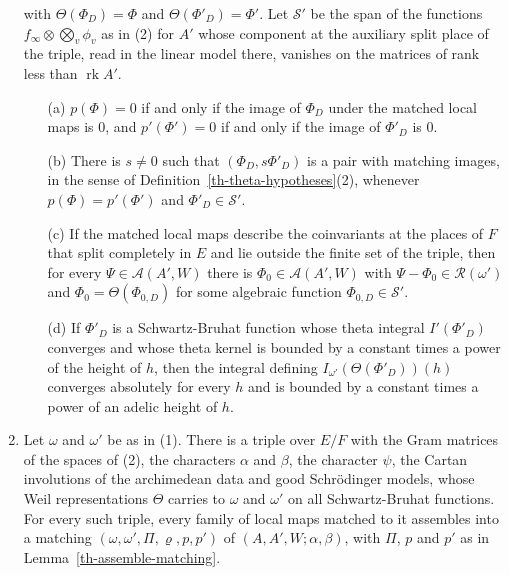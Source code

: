 \begin{lemma}
\begin{enumerate}
  with $\Theta(\Phi_D)=\Phi$ and $\Theta(\Phi'_D)=\Phi'$. Let $\mathcal S'$ be
  the span of the functions $f_\infty\otimes\bigotimes_v\phi_v$ as in (2) for
  $A'$ whose component at the auxiliary split place of the triple, read in the
  linear model there, vanishes on the matrices of rank less than
  $\operatorname{rk}A'$.
  \begin{enumerate}
  \item[(a)] $p(\Phi)=0$ if and only if the image of $\Phi_D$ under the
    matched local maps is $0$, and $p'(\Phi')=0$ if and only if the image of
    $\Phi'_D$ is $0$.
  \item[(b)] There is $s\neq0$ such that $(\Phi_D,s\Phi'_D)$ is a pair with
    matching images, in the sense of Definition~\ref{th-theta-hypotheses}(2),
    whenever $p(\Phi)=p'(\Phi')$ and $\Phi'_D\in\mathcal S'$.
  \item[(c)] If the matched local maps describe the coinvariants at the places
    of $F$ that split completely in $E$ and lie outside the finite set of the
    triple, then for every $\Psi\in\mathcal A(A',W)$ there is
    $\Phi_0\in\mathcal A(A',W)$ with $\Psi-\Phi_0\in\mathcal R(\omega')$ and
    $\Phi_0=\Theta(\Phi_{0,D})$ for some algebraic function
    $\Phi_{0,D}\in\mathcal S'$.
  \item[(d)] If $\Phi'_D$ is a Schwartz-Bruhat function whose theta integral
    $I'(\Phi'_D)$ converges and whose theta kernel is bounded by a constant
    times a power of the height of $h$, then the integral defining
    $I_{\omega'}(\Theta(\Phi'_D))(h)$ converges absolutely for every $h$ and
    is bounded by a constant times a power of an adelic height of $h$.
  \end{enumerate}
\item Let $\omega$ and $\omega'$ be as in (1). There is a triple over $E/F$
  with the Gram matrices of the spaces of (2), the characters $\alpha$ and
  $\beta$, the character $\psi$, the Cartan involutions of the archimedean
  data and good Schrödinger models, whose Weil representations $\Theta$
  carries to $\omega$ and $\omega'$ on all Schwartz-Bruhat functions. For every
  such triple, every family of local maps matched to it assembles into a
  matching $(\omega,\omega',\Pi,\varrho,p,p')$ of $(A,A',W;\alpha,\beta)$, with
  $\Pi$, $p$ and $p'$ as in Lemma~\ref{th-assemble-matching}.
\end{enumerate}
\end{lemma}
